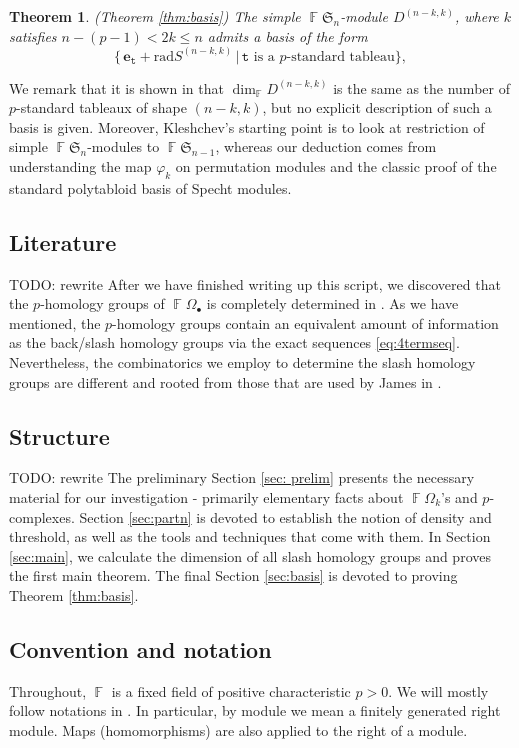 \documentclass[a4paper]{amsart}
\numberwithin{equation}{subsection}
\newtheorem*{theorem*}{Theorem}
\theoremstyle{definition}
\DeclareMathOperator{\F}{\mathbb{F}}
\newcommand{\comm}[1]{{\color{red}#1}}
\newcommand{\bfe}{\pmb{e}}
\newcommand{\tbx}{\mathtt{t}}
\numberwithin{equation}{subsection}
\begin{document}
\begin{theorem*}{\rm (Theorem \ref{thm:basis})}
The simple $\F\mathfrak{S}_n$-module $D^{(n-k,k)}$, where $k$ satisfies $n-(p-1)<2k\leq n$ admits a basis
of the form\[
\big\{\,\bfe_{\tbx}+\mathrm{rad}S^{(n-k,k)}\, \big| \, \tbx\text{ is a $p$-standard tableau}  \big\},\]
\end{theorem*}

We remark that it is shown in \cite{Kl} that $\dim_{\F} D^{(n-k,k)}$ is the same as the number of $p$-standard tableaux of shape $(n-k,k)$, but no explicit description of such a basis is given.  Moreover, Kleshchev's starting point is to look at restriction of simple $\F\mathfrak{S}_{n}$-modules to $\F\mathfrak{S}_{n-1}$, whereas our deduction comes from understanding the map $\varphi_k$ on permutation modules and the classic proof of the standard polytabloid basis of Specht modules.

\subsection*{Literature}
\comm{TODO: rewrite}
After we have finished writing up this script, we discovered that the $p$-homology groups of $\F\Omega_\bullet$ is completely determined in \cite{BJS}.
As we have mentioned, the $p$-homology groups contain an equivalent amount of information as the back/slash homology groups via the exact sequences \eqref{eq:4termseq}.  Nevertheless, the combinatorics we employ to determine the slash homology groups are different and rooted from those that are used by James in \cite{James2, James3}.


\subsection*{Structure}
\comm{TODO: rewrite}
The preliminary Section \ref{sec: prelim} presents the necessary material for our investigation - primarily elementary facts about $\F\Omega_k$'s and $p$-complexes.
Section \ref{sec:partn} is devoted to establish the notion of density and threshold, as well as the tools and techniques that come with them.
In Section \ref{sec:main}, we calculate the dimension of all slash homology groups and proves the first main theorem.
The final Section \ref{sec:basis} is devoted to proving Theorem \ref{thm:basis}.


\subsection*{Convention and notation}
Throughout, $\F$ is a fixed field of positive characteristic $p>0$.
We will mostly follow notations in \cite{Wil}.
In particular, by module we mean a finitely generated right module.
Maps (homomorphisms) are also applied to the right of a module.
\end{document}
